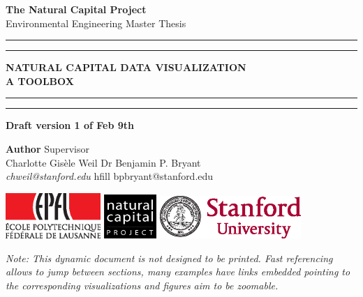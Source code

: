 
\begin{titlingpage}
\begin{center}
\Large
\textbf{The Natural Capital Project} \\
\vspace{1cm}
Environmental Engineering Master Thesis
\vspace{2cm}
\hrule
\vspace{0.1cm}
\hrule
\vspace{1cm}
\Huge
\textbf{NATURAL CAPITAL DATA VISUALIZATION } \\
\huge
\textbf{A TOOLBOX} \\

\Large
\vspace{0.2cm}

\vspace{1cm}
\hrule
\vspace{0.1cm}
\hrule

\end{center}

\vfill
\textbf{Draft version 1 of Feb 9th} \\
\vspace{0.5cm}

\noindent \textbf{Author} \hfill {Supervisor} \\
Charlotte Gisèle Weil \hfill Dr Benjamin P. Bryant        \\
\textit {chweil@stanford.edu} hfill {bpbryant@stanford.edu} \\
\vspace{0.8cm}

\noindent \includegraphics[width=0.27\textwidth]{images/epfl-logo.eps}
\hfill  \hfill \hfill  \includegraphics[width=0.15\textwidth]{images/natcap-logo.eps} \hfill  \hfill 
\includegraphics[width=0.4\textwidth]{images/stanford-logo.eps}

\newpage
\vspace{\fill}
\textit{Note: This dynamic document is not designed to be printed. Fast referencing allows to jump between sections, many examples have links embedded pointing to the corresponding visualizations and figures aim to be zoomable.}

\end{titlingpage}

